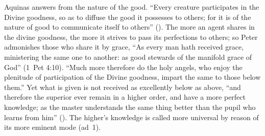 Aquinas answers from the nature of the good. ``Every creature participates
in the Divine goodness, so as to diffuse the good it possesses to others;
for it is of the nature of good to communicate itself to others''
(). The more an
agent shares in the divine goodness, the more it strives to pass its
perfections to others; so Peter admonishes those who share it by grace, ``As
every man hath received grace, ministering the same one to another: as good
stewards of the manifold grace of God'' (1~Pet 4:10). ``Much more therefore
do the holy angels, who enjoy the plenitude of participation of the Divine
goodness, impart the same to those below them.'' Yet what is given is not
received as excellently below as above, ``and therefore the superior ever
remain in a higher order, and have a more perfect knowledge; as the master
understands the same thing better than the pupil who learns from him''
(). The higher's knowledge is called more universal
by reason of its more eminent mode (ad~1).

